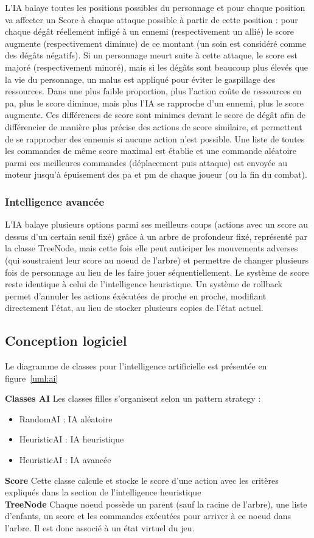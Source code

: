 \documentclass[a4paper,12pt]{article}
\begin{document}
L'IA balaye toutes les positions possibles du personnage et pour chaque position va affecter un Score à chaque attaque possible à partir de cette position : pour chaque dégât réellement infligé à un ennemi (respectivement un allié) le score augmente (respectivement diminue) de ce montant (un soin est considéré comme des dégâts négatifs). Si un personnage meurt suite à cette attaque, le score est majoré (respectivement minoré), mais si les dégâts sont beaucoup plus élevés que la vie du personnage, un malus est appliqué pour éviter le gaspillage des ressources. Dans une plus faible proportion, plus l'action coûte de ressources en pa, plus le score diminue, mais plus l'IA se rapproche d'un ennemi, plus le score augmente. Ces différences de score sont minimes devant le score de dégât afin de différencier de manière plus précise des actions de score similaire, et permettent de se rapprocher des ennemis si aucune action n'est possible.
Une liste de toutes les commandes de même score maximal est établie et une commande aléatoire parmi ces meilleures commandes (déplacement puis attaque) est envoyée au moteur jusqu'à épuisement des pa et pm de chaque joueur (ou la fin du combat).

\subsubsection{Intelligence avancée}

L'IA balaye plusieurs options parmi ses meilleurs coups (actions avec un score au dessus d'un certain seuil fixé) grâce à un arbre de profondeur fixé, représenté par la classe TreeNode, mais cette fois elle peut anticiper les mouvements adverses (qui soustraient leur score au noeud de l'arbre) et permettre de changer plusieurs fois de personnage au lieu de les faire jouer séquentiellement. Le système de score reste identique à celui de l'intelligence heuristique. Un système de rollback permet d'annuler les actions éxécutées de proche en proche, modifiant directement l'état, au lieu de stocker plusieurs copies de l'état actuel.

\clearpage
\subsection{Conception logiciel}
Le diagramme de classes pour l'intelligence artificielle est présentée en figure~\ref{uml:ai}

\textbf{Classes AI} Les classes filles s'organisent selon un pattern strategy : 
\begin{itemize}
\item RandomAI : IA aléatoire
\item HeuristicAI : IA heuristique
\item HeuristicAI : IA avancée
\end{itemize}
\textbf{Score} Cette classe calcule et stocke le score d'une action avec les critères expliqués dans la section de l'intelligence heuristique
\\\textbf{TreeNode} Chaque noeud possède un parent (sauf la racine de l'arbre), une liste d'enfants, un score et les commandes exécutées pour arriver à ce noeud dans l'arbre. Il est donc associé à un état virtuel du jeu.
\end{document}
